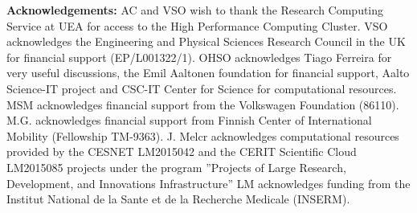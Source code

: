 \documentclass[twoside,twocolumn,9pt]{article}
\begin{document}
{\bf Acknowledgements: }
AC and VSO wish to thank the Research Computing Service at UEA for access to the High Performance Computing Cluster. VSO acknowledges the Engineering and Physical Sciences Research Council in the UK for financial support (EP/L001322/1).
%
OHSO acknowledges Tiago Ferreira for very useful discussions, the Emil Aaltonen foundation for financial support, Aalto Science-IT project and CSC-IT Center for Science for computational resources. 
%
MSM acknowledges financial support from the Volkswagen Foundation (86110).
%
M.G. acknowledges financial support from Finnish Center of International Mobility (Fellowship TM-9363).
%
J. Melcr acknowledges computational resources provided by the CESNET LM2015042 and the CERIT Scientific Cloud LM2015085 projects under the program ''Projects of Large Research, Development, and Innovations Infrastructure''
%
LM acknowledges funding from the Institut National de la Sante et de la Recherche Medicale (INSERM).

\end{document}
